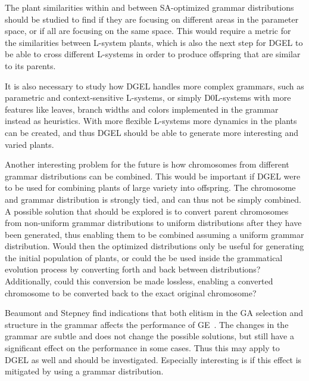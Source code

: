 The plant similarities within and between SA-optimized grammar distributions should be studied to find if they are focusing on different areas in the parameter space, or if all are focusing on the same space.
This would require a metric for the similarities between L-system plants, which is also the next step for DGEL to be able to cross different L-systems in order to produce offspring that are similar to its parents.

It is also necessary to study how DGEL handles more complex grammars, such as parametric and context-sensitive L-systems, or simply D0L-systems with more features like leaves, branch widths and colors implemented in the grammar instead as heuristics.
With more flexible L-systems more dynamics in the plants can be created, and thus DGEL should be able to generate more interesting and varied plants.

Another interesting problem for the future is how chromosomes from different grammar distributions can be combined.
This would be important if DGEL were to be used for combining plants of large variety into offspring.
The chromosome and grammar distribution is strongly tied, and can thus not be simply combined.
A possible solution that should be explored is to convert parent chromosomes from non-uniform grammar distributions to uniform distributions after they have been generated, thus enabling them to be combined assuming a uniform grammar distribution.
Would then the optimized distributions only be useful for generating the initial population of plants, or could the be used inside the grammatical evolution process by converting forth and back between distributions?
Additionally, could this conversion be made lossless, enabling a converted chromosome to be converted back to the exact original chromosome?

Beaumont and Stepney find indications that both elitism in the GA selection and structure in the grammar affects the performance of GE~\cite{2009Beaumont}.
The changes in the grammar are subtle and does not change the possible solutions, but still have a significant effect on the performance in some cases.
Thus this may apply to DGEL as well and should be investigated.
Especially interesting is if this effect is mitigated by using a grammar distribution.
